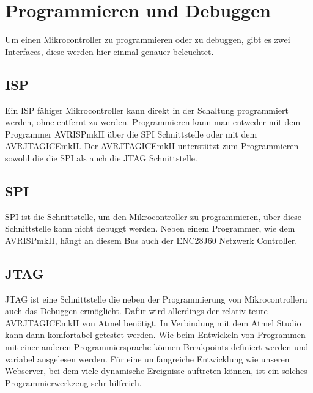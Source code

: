 \chapter{Programmieren und Debuggen}

Um einen Mikrocontroller zu programmieren oder zu debuggen, gibt es zwei
Interfaces, diese werden hier einmal genauer beleuchtet.

\section{ISP}

Ein \acf{ISP} fähiger Mikrocontroller kann direkt in der Schaltung programmiert
werden, ohne entfernt zu werden. Programmieren kann man entweder mit dem
Programmer AVRISPmkII über die \acs{SPI} Schnittstelle oder mit dem  
AVRJTAGICEmkII. Der AVRJTAGICEmkII unterstützt zum Programmieren sowohl die
die \acs{SPI} als auch die \acs{JTAG} Schnittstelle.

\section{SPI}

\acf{SPI} ist die Schnittstelle, um den Mikrocontroller zu programmieren, über
diese Schnittstelle kann nicht debuggt werden. Neben einem Programmer, wie dem
AVRISPmkII, hängt an diesem Bus auch der ENC28J60 Netzwerk Controller.

\section{JTAG}

\acf{JTAG} ist eine Schnittstelle die neben der Programmierung von
Mikrocontrollern auch das Debuggen ermöglicht.
Dafür wird allerdings der relativ teure AVRJTAGICEmkII von Atmel benötigt.
In Verbindung mit dem Atmel Studio kann dann komfortabel getestet
werden. Wie beim Entwickeln von Programmen mit einer anderen Programmiersprache
können Breakpoints definiert werden und variabel ausgelesen werden. Für eine
umfangreiche Entwicklung wie unseren Webserver, bei dem viele dynamische
Ereignisse auftreten können, ist ein solches Programmierwerkzeug sehr hilfreich.
